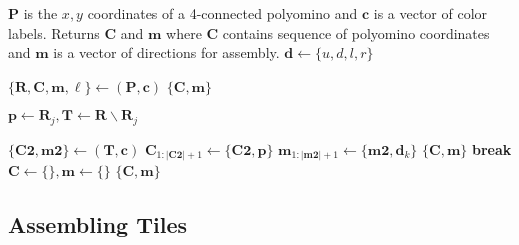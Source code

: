 \begin{algorithm}
\newcommand\algotext[1]{\end{algorithmic}#1\begin{algorithmic}[1]}
\caption{($\mathbf{P},\mathbf{c})$   \label{alg:Decompose}}
$\mathbf{P}$ is the $x,y$ coordinates of a 4-connected polyomino and $ \mathbf{c} $ is a vector of color labels.
Returns $ \mathbf{C} $ and $\mathbf{m}$ where $ \mathbf{C} $ contains sequence of polyomino coordinates and $\mathbf{m}$ is a vector of directions for assembly. $\mathbf{d} \gets\{u,d,l,r\}$
\begin{algorithmic}[1]

\State $ \{ \mathbf{R},\mathbf{C}, \mathbf{m}, \ell \} \gets ${}$(\mathbf{P},\mathbf{c})$
\State \Return $\{ \mathbf{C},\mathbf{m} \}$ 
\EndIf

\State $\mathbf{p} \gets \mathbf{R}_j,  \mathbf{T} \gets  \mathbf{R}  \backslash   \mathbf{R}_j$

\State $\{\mathbf{C2},\mathbf{m2} \}\gets ${}$(\mathbf{T},\mathbf{c})$
\State $\mathbf{C}_{1:|\mathbf{C2}|+1} \gets \{\mathbf{C2},\mathbf{p}\}$
\State $ \mathbf{m}_{1:|\mathbf{m2}|+1} \gets \{\mathbf{m2},\mathbf{d}_k\}$
\State \Return $\{ \mathbf{C}, \mathbf{m} \}$ 
\EndIf
\State \textbf{break}
\EndIf
\EndFor
\EndFor
\State $\mathbf{C} \gets \{\}, \mathbf{m} \gets \{\}$
\State \Return $\{ \mathbf{C}, \mathbf{m} \}$ 
\end{algorithmic}
\end{algorithm} 


  
\subsection{Assembling Tiles}


